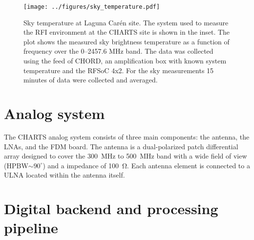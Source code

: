 \begin{figure}[h!]
  \centering
  \texttt{[image: ../figures/sky\_temperature.pdf]}
  \caption[Sky temperature at Laguna Carén site]{Sky temperature at Laguna Carén site. The system used to measure the RFI environment at the CHARTS site is shown in the inset. The plot shows the measured sky brightness temperature as a function of frequency over the 0--2457.6 MHz band. The data was collected using the feed of CHORD, an amplification box with known system temperature and the RFSoC 4x2. For the sky measurements 15 minutes of data were collected and averaged.}
  \label{fig:rfi_caren}
\end{figure}


\section{Analog system}
The CHARTS analog system consists of three main components: the antenna, the LNAs, and the FDM board. The antenna is a dual-polarized patch differential array designed to cover the \SI{300}{\mega\hertz} to \SI{500}{\mega\hertz} band with a wide field of view (HPBW$\sim90^\circ$) and a impedance of \SI{100}{\ohm}. Each antenna element is connected to a ULNA located within the antenna itself.

\section{Digital backend and processing pipeline}
\label{sec:charts_digital_backend}



